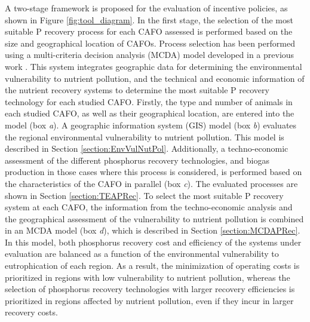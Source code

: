 \begin{refsection}[referencesCh5]
A two-stage framework is proposed for the evaluation of incentive policies, as shown in Figure \ref{fig:tool_diagram}. 
In the first stage, the selection of
the most suitable P recovery process for each CAFO assessed is performed based on the size and geographical location of CAFOs. Process selection has been performed using a multi-criteria decision analysis (MCDA) model developed in a previous work \citep{Tool}. This system integrates geographic data for determining the environmental vulnerability to nutrient pollution, and the technical and economic information of the nutrient recovery systems to determine the most suitable P recovery technology for each studied CAFO. Firstly, the type and number of animals in each studied CAFO, as well as their geographical location, are entered into the model (box \textit{a}). 
A geographic information system (GIS) model (box \textit{b}) evaluates the regional environmental vulnerability to nutrient pollution. This model is
described in Section \ref{section:EnvVulNutPol}.
Additionally, a techno-economic assessment of the different phosphorus recovery technologies, and biogas production in those cases where this process is considered, is performed based on the characteristics of the CAFO in parallel (box \textit{c}). The evaluated processes are shown in Section \ref{section:TEAPRec}.
To select the most suitable P recovery system at each CAFO, the information from the techno-economic analysis and the geographical assessment of the vulnerability to nutrient pollution is combined in an MCDA model (box \textit{d}), which is described in Section \ref{section:MCDAPRec}. In this model, both phosphorus recovery cost and efficiency of the systems under evaluation are balanced as a function of the environmental vulnerability to
eutrophication of each region. As a result, the minimization of operating costs is prioritized in regions with low vulnerability to nutrient pollution, whereas the selection of phosphorus recovery technologies with larger recovery efficiencies is prioritized in regions affected by nutrient pollution, even if they incur in larger recovery costs.


\end{refsection}
